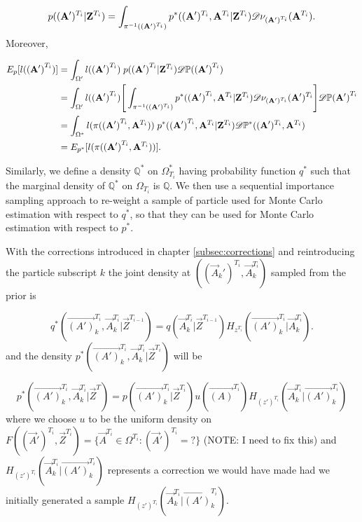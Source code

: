 {\begin{equation*}
    p((\mathbf{A}')^{T_i} | \mathbf{Z}^{T_i}) = \int_{\pi^{-1}((\mathbf{A}')^{T_i})} p^*((\mathbf{A}')^{T_i}, \mathbf{\mathbf{A}}^{T_i} | \mathbf{Z}^{T_i})\mathscr{D} \nu_{(\mathbf{A')}^{T_i}} (\mathbf{A}^{T_i}).
\end{equation*}
Moreover,

\begin{align*}
    E_{p}[l(\mathbf{(A')}^{T_i})]  &= \int_{\Omega'} l(\mathbf{(A')}^{T_i})\; p(\mathbf{(A')}^{T_i} | \mathbf{Z}^{T_i}) \mathscr{D} \mathbb{P}(\mathbf{(A')}^{T_i}) \\
    &= \int_{\Omega'} l(\mathbf{(A')}^{T_i})\Bigg[\int_{\pi^{-1}((\mathbf{A}')^{T_i})} p^*(\mathbf{(A')}^{T_i}, \mathbf{A}^{T_i} | \mathbf{Z}^{T_i}) \mathscr{D} \nu_{(\mathbf{A}')^{T_i}}(\mathbf{A}')^{T_i} \Bigg] \mathscr{D} \mathbb{P}{(\mathbf{A}')}^{T_i} \\ 
    &= \int_{\Omega^*} l(\pi(\mathbf{(A')}^{T_i}, \mathbf{A}^{T_i}))\; p^*(\mathbf{(A')}^{T_i}, \mathbf{A}^{T_i} | \mathbf{Z}^{T_i}) \mathscr{D} \mathbb{P}^*((\mathbf{A}')^{T_i}, \mathbf{A}^{T_i}) \\ 
    &= E_{p^*}[l(\pi (\mathbf{(A')}^{T_i}, \mathbf{A}^{T_i}))].
\end{align*}

Similarly, we define a density $\mathbb{Q}^*$ on $\Omega^*_{T_i}$ having probability function $q^*$ such that the marginal density of $\mathbb{Q}^*$ on $\Omega_{T_i}$ is $\mathbb{Q}$. We then use a sequential importance sampling approach to re-weight a sample of particle used for Monte Carlo estimation with respect to $q^*$, so that they can be used for Monte Carlo estimation with respect to $p^*$.

With the corrections introduced in chapter \ref{subsec:corrections} and reintroducing the particle subscript $k$ the joint density at $((\vec{A}_k')^{T_i}, \vec{A}_k^{T_i})$ sampled from the prior is

\begin{equation*}
    q^*(\vec{(A')}^{T_i}_k, \vec{A}^{T_i}_k | \vec{Z}^{T_{i-1}}) = q(\vec{A}^{T_i}_k | \vec{Z}^{T_{i-1}}) H_{z^{T_i}} (\vec{(A')}^{T_i}_k | \vec{A}^{{T_i}}_k).
\end{equation*}
and the density $p^*(\vec{(A')}^{T_i}_k, \vec{A}^{T_i}_k | \vec{Z}^{T_i})$ will be

\begin{equation*}
    p^*(\vec{(A')}^{T_i}_k, \vec{A}^{T_i}_k | \vec{Z}^{T}) = p(\vec{(A')}^{T_i}_k | \vec{Z}^{T_i}) u(\vec{(A)}^{T_i}) H_{(z')^{T_i}} (\vec{A}^{T_i}_k | \vec{(A')}^{{T_i}}_k)
\end{equation*}
where we choose $u$ to be the uniform density on $F((\vec{A}')^{T_i}, \vec{Z}^{T_i}) = \{ \vec{A}^{T_i} \in \Omega^{T_i} : (\vec{A}')^{T_i} = ?\}$ (NOTE: I need to fix this) and $H_{(z')^{T_i}} (\vec{A}^{T_i}_k | \vec{(A')}^{{T_i}}_k)$ represents a correction we would have made had we initially generated a sample $H_{(z')^{T_i}} (\vec{A}^{T_i}_k | \vec{(A')}^{{T_i}}_k)$.

}
